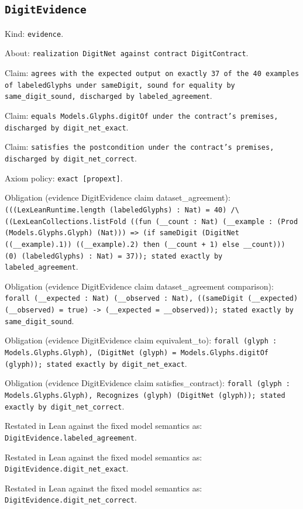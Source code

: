 \documentclass[11pt]{article}
\begin{document}
\subsection*{\texttt{DigitEvidence}}
\noindent Kind: \texttt{evidence}.\par
\noindent About: \texttt{realization DigitNet against contract DigitContract}.\par
\noindent Claim: \texttt{agrees with the expected output on exactly 37 of the 40 examples of labeledGlyphs under sameDigit, sound for equality by same\_digit\_sound, discharged by labeled\_agreement}.\par
\noindent Claim: \texttt{equals Models.Glyphs.digitOf under the contract's premises, discharged by digit\_net\_exact}.\par
\noindent Claim: \texttt{satisfies the postcondition under the contract's premises, discharged by digit\_net\_correct}.\par
\noindent Axiom policy: \texttt{exact [propext]}.\par
\noindent Obligation (evidence DigitEvidence claim dataset\_agreement): \texttt{(((LexLeanRuntime.length (labeledGlyphs) : Nat) = 40) /\textbackslash{} ((LexLeanCollections.listFold ((fun (\_\_count : Nat) (\_\_example : (Prod (Models.Glyphs.Glyph) (Nat))) => (if sameDigit (DigitNet ((\_\_example).1)) ((\_\_example).2) then (\_\_count + 1) else \_\_count))) (0) (labeledGlyphs) : Nat) = 37)); stated exactly by labeled\_agreement}.\par
\noindent Obligation (evidence DigitEvidence claim dataset\_agreement comparison): \texttt{forall (\_\_expected : Nat) (\_\_observed : Nat), ((sameDigit (\_\_expected) (\_\_observed) = true) -> (\_\_expected = \_\_observed)); stated exactly by same\_digit\_sound}.\par
\noindent Obligation (evidence DigitEvidence claim equivalent\_to): \texttt{forall (glyph : Models.Glyphs.Glyph), (DigitNet (glyph) = Models.Glyphs.digitOf (glyph)); stated exactly by digit\_net\_exact}.\par
\noindent Obligation (evidence DigitEvidence claim satisfies\_contract): \texttt{forall (glyph : Models.Glyphs.Glyph), Recognizes (glyph) (DigitNet (glyph)); stated exactly by digit\_net\_correct}.\par
\noindent Restated in Lean against the fixed model semantics as: \texttt{DigitEvidence.labeled\_agreement}.\par
\noindent Restated in Lean against the fixed model semantics as: \texttt{DigitEvidence.digit\_net\_exact}.\par
\noindent Restated in Lean against the fixed model semantics as: \texttt{DigitEvidence.digit\_net\_correct}.\par
\end{document}
